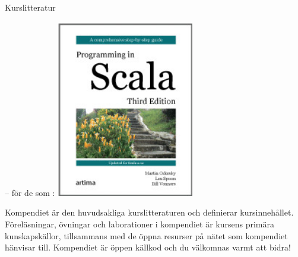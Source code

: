 \begin{Slide}{Kurslitteratur}
\begin{minipage}{0.35\textwidth}
\noindent -- för de som :
\vskip0.7mm
\includegraphics[width=0.45\textwidth]{../img/pinsbook.jpg}\hskip4mm
\end{minipage}
\end{Slide}

\ifkompendium
\noindent Kompendiet är den huvudsakliga kurslitteraturen och definierar kursinnehållet. Föreläsningar, övningar och laborationer i kompendiet är kursens primära kunskapskällor, tillsammans med de öppna resurser på nätet som kompendiet hänvisar till. Kompendiet är öppen källkod och du välkomnas varmt att bidra!

